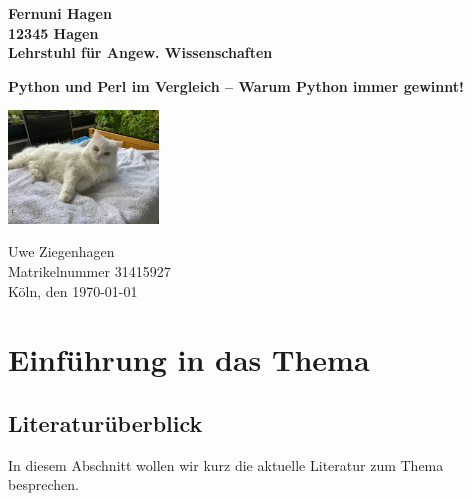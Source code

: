 \documentclass[ngerman, 12pt,parskip=half]{scrreprt}
\begin{document}
\begin{titlepage}
{\large\textbf{Fernuni Hagen \\ 12345 Hagen \\ Lehrstuhl für Angew. Wissenschaften}}

\vspace*{4cm}

{\bfseries\huge Python und Perl im Vergleich -- Warum Python immer gewinnt! }

\begin{center}
	\includegraphics[width=4cm]{Bilder/Katze1}
\end{center}

\vfill
Uwe Ziegenhagen \\
Matrikelnummer 31415927 \\
Köln, den \today 
\end{titlepage}

\tableofcontents
\listoffigures
\listoftables
	
\chapter{Einführung in das Thema}	
\section{Literaturüberblick}

In diesem Abschnitt wollen wir kurz die aktuelle Literatur zum Thema besprechen.	
	
\blindtext[10]
	
\end{document}
